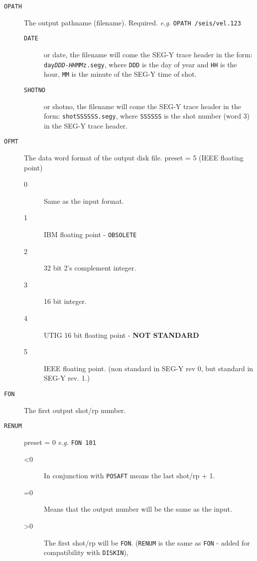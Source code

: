 \begin{description}
\item[\texttt{OPATH}] The output pathname (filename).  Required. \textit{e.g.} \texttt{OPATH /seis/vel.123}
\begin{description}
\item[\texttt{DATE}] or date, the filename will come the SEG-Y trace header in the form: \texttt{day\textit{DDD}-\textit{HHMM}z.segy}, where \texttt{DDD} is the day of year and \texttt{HH}  is the hour, \texttt{MM} is the minute of the SEG-Y time of \gls{shot}.
\item[\texttt{SHOTNO}]  or shotno, the filename will come the SEG-Y trace header in the form: \texttt{shotSSSSSS.segy}, where \texttt{SSSSSS} is the \gls{shot} number (word 3) in the SEG-Y trace header.
\end{description}

\item[\texttt{OFMT}] The data word format of the output disk file.  \Gls{preset} = 5 (IEEE floating point)
\begin{description}
\item[0] Same as the input format.
\item[1] IBM floating point - \texttt{OBSOLETE}
\item[2] 32 bit 2's complement integer.
\item[3] 16 bit integer.
\item[4] UTIG 16 bit floating point - \textbf{NOT STANDARD}
\item[5] IEEE floating point.  (non standard in SEG-Y rev 0, but standard in SEG-Y rev. 1.)
\end{description}

\item[\texttt{FON}] The first output \gls{shot}/\gls{rp} number.
\item[\texttt{RENUM}] \Gls{preset} = 0     \textit{e.g.}   \texttt{FON 101}
\begin{description}
    \item[<0]       In conjunction with \texttt{POSAFT} means the last \gls{shot}/\gls{rp} + 1.
    \item[=0]       Means that the output number will be the same as the input.
    \item[>0]       The first \gls{shot}/\gls{rp} will be \texttt{FON}.  (\texttt{RENUM} is the same as \texttt{FON} - added for compatibility with \texttt{DISKIN}),
\end{description}


\end{description}
